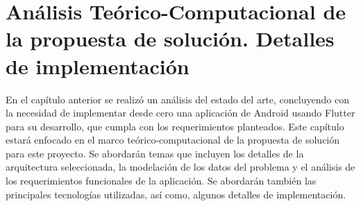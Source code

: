 \chapter{Análisis Teórico-Computacional de la propuesta de solución. Detalles de implementación}\label{chapter:proposal}
En el capítulo anterior se realizó un análisis del estado del arte, concluyendo con la
necesidad de implementar desde cero una aplicación de Android usando Flutter para su desarrollo, que cumpla con los requerimientos planteados.
Este capítulo estará enfocado en el marco teórico-computacional de la propuesta de
solución para este proyecto. Se abordarán temas que incluyen los detalles de la arquitectura seleccionada, la modelación de los datos del problema
y el análisis de los requerimientos funcionales de la aplicación. Se abordarán también las principales tecnologías utilizadas, así como, algunos detalles de implementación.
